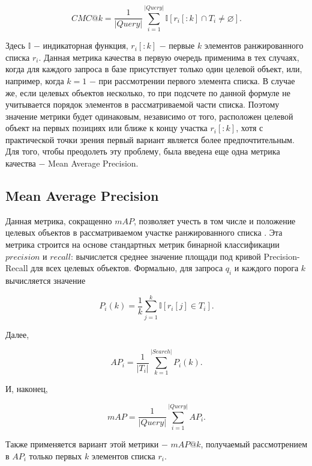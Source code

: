 \begin{equation}
    CMC @ k = \frac{1}{|Query|} \sum \limits_{i = 1}^{|Query|} \mathbb{I} [r_i[:k] \cap T_i \neq \varnothing].
\end{equation}

Здесь $\mathbb{I}$ $-$ индикаторная функция, $r_i[:k]$ $-$ первые $k$ элементов ранжированного списка $r_i$. Данная метрика качества в первую очередь применима в тех случаях, когда для каждого запроса в базе присутствует только один целевой объект, или, например, когда $k = 1$ $-$ при рассмотрении первого элемента списка. В случае же, если целевых объектов несколько, то при подсчете по данной формуле не учитывается порядок элементов в рассматриваемой части списка. Поэтому значение метрики будет одинаковым, независимо от того, расположен целевой объект на первых позициях или ближе к концу участка $r_i[:k]$, хотя с практической точки зрения первый вариант является более предпочтительным. Для того, чтобы преодолеть эту проблему, была введена еще одна метрика качества $-$ Mean Average Precision.

\subsection{Mean Average Precision}

Данная метрика, сокращенно $mAP$, позволяет учесть в том числе и положение целевых объектов в рассматриваемом участке ранжированного списка \cite{zheng2015scalable}. Эта метрика строится на основе стандартных метрик бинарной классификации $precision$ и $recall$: вычислется среднее значение площади под кривой Precision-Recall для всех целевых объектов. Формально, для запроса $q_i$ и каждого порога $k$ вычисляется значение

\begin{equation}
    P_i(k) = \frac{1}{k} \sum \limits_{j = 1}^{k} \mathbb I [r_i[j] \in T_i].
\end{equation}

Далее,

\begin{equation}
    AP_i = \frac{1}{|T_i|} \sum \limits_{k = 1}^{|Search|} P_i(k).
\end{equation}

И, наконец, 

\begin{equation}
    mAP = \frac{1}{|Query|} \sum \limits_{i = 1}^{|Query|} AP_i.
\end{equation}

Также применяется вариант этой метрики $-$ $mAP@k$, получаемый рассмотрением в $AP_i$ только первых $k$ элементов списка $r_i$. 


